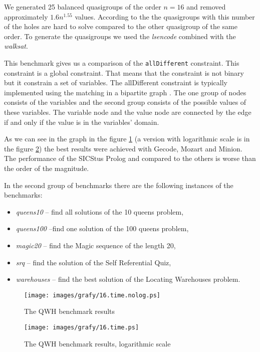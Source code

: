 We generated 25 balanced quasigroups of the 
order $n = 16$ and removed approximately $1.6 n^{1.55}$ values. According to the 
\cite{Achlioptas00generatingsatisfiable} the quasigroups with this number of the 
holes are hard to solve compared to the other quasigroup of the same order. To 
generate the quasigroups we used the {\em lsencode} combined with the {\em walksat}.
 
This benchmark gives us a comparison of the \texttt{allDifferent} constraint. This 
constraint is a global constraint. That means that the constraint is not binary but
it constrain a set of variables. The allDifferent constraint is typically implemented
using the matching in a bipartite graph \cite{hoeve:alldifferent}. The one group of nodes consists of the 
variables and the second group consists of the possible values of these variables.
The variable node and the value node are connected by the edge if and only if
the value is in the variables' domain. 

As we can see in the graph in the figure \ref{results:qwh1} (a version with logarithmic 
scale is in the figure \ref{results:qwh2}) the best results were achieved with Gecode,
Mozart and Minion. The performance of the SICStus Prolog and \eclipse compared to
the others is worse than the order of the magnitude.
  
In the second group of benchmarks there are the following instances of the benchmarks:

\begin{itemize}
  \item {\em queens10} -- find all solutions of the 10 queens problem,
  \item {\em queens100} --find one solution of the 100 queens problem, 
  \item {\em magic20} -- find the Magic sequence of the length 20,
  \item {\em srq} -- find the solution of the Self Referential Quiz,
  \item {\em warehouses} -- find the best solution of the Locating Warehouses problem.
\end{itemize}


\begin{figure}
  \centering
  \texttt{[image: images/grafy/16.time.nolog.ps]}
  \caption{The QWH benchmark results}
  \label{results:qwh1}
\end{figure}

\begin{figure}
  \centering
  \texttt{[image: images/grafy/16.time.ps]}
  \caption{The QWH benchmark results, logarithmic scale}
  \label{results:qwh2}
\end{figure}

